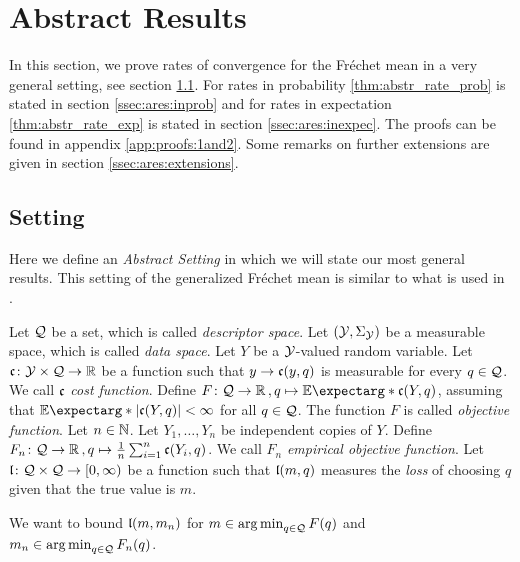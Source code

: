 \section{Abstract Results}\label{sec:abstract_results}
%
In this section, we prove rates of convergence for the Fréchet mean in a very general setting, see section \ref{ssec:ares:generalsetting}. For rates in probability \autoref{thm:abstr_rate_prob} is stated in section \ref{ssec:ares:inprob} and for rates in expectation \autoref{thm:abstr_rate_exp} is stated in section \ref{ssec:ares:inexpec}. The proofs can be found in appendix \autoref{app:proofs:1and2}. Some remarks on further extensions are given in section \ref{ssec:ares:extensions}.
%
%
%
\subsection{Setting}\label{ssec:ares:generalsetting}
%
%
Here we define an \textit{Abstract Setting} in which we will state our most general results. This setting of the generalized Fréchet mean is similar to what is used in \cite{huckemann11, eltzner19}.

Let $\mathcal{Q}$ be a set, which is called \textit{descriptor space}. Let $(\mathcal{Y}, \Sigma_{\mathcal{Y}})$ be a measurable space, which is called \textit{data space}. Let $Y$ be a $\mathcal{Y}$-valued random variable. Let $\mathfrak{c} \colon \mathcal{Y} \times \mathcal{Q} \to \mathbb{R}$ be a function such that $y\to \mathfrak{c} (y,q)$ is measurable for every $q\in\mathcal{Q}$. We call $\mathfrak{c}$ \emph{cost function}. Define $F \colon \mc Q \to \R\eqcm q\mapsto \Ex*{\mf c(Y, q)}$, assuming that $\Ex*{\abs{\mf c(Y, q)}} < \infty$ for all $q\in\mathcal{Q}$. The function $F$ is called \textit{objective function}. 
Let $n\in\mathbb{N}$. Let $Y_1, \dots, Y_n$ be independent copies of $Y$. Define $F_n \colon \mathcal{Q} \to \mathbb{R}\, , q\mapsto \frac1n \sum_{i=1}^n \mathfrak{c}(Y_i, q)$. We call $F_n$ \textit{empirical objective function}. Let $\mathfrak{l} \colon \mathcal{Q} \times \mathcal{Q} \to [0,\infty)$ be a function such that $\mathfrak{l}(m,q)$ measures the \textit{loss} of choosing $q$ given that the true value is $m$. 

We want to bound $\mathfrak{l}(m, m_n)$ for $m\in\operatorname*{arg\,min}_{q\in\mathcal{Q}} F(q)$ and $m_n\in\operatorname*{arg\,min}_{q\in\mathcal{Q}} F_n(q)$.
%
%
%
%
